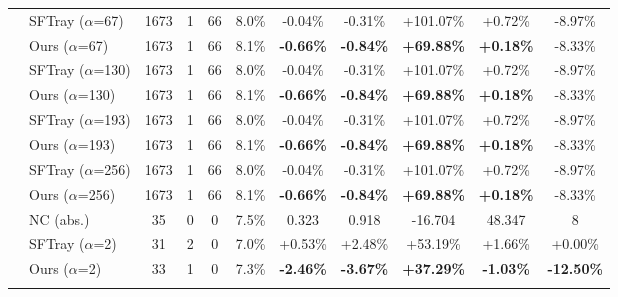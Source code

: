 \begin{table}[t]
{\begin{tabular}{ll|cccc|ccc|cc}
 & SFTray ($\alpha$=67) & 1673 & 1 & 66 & 8.0\% & -0.04\% & -0.31\% & +101.07\% & +0.72\% & -8.97\% \\

 & Ours ($\alpha$=67) & 1673 & 1 & 66 & 8.1\% & \textbf{-0.66\%} & \textbf{-0.84\%} & \textbf{+69.88\%} & \textbf{+0.18\%} & -8.33\% \\

\addlinespace[0.3em]

 & SFTray ($\alpha$=130) & 1673 & 1 & 66 & 8.0\% & -0.04\% & -0.31\% & +101.07\% & +0.72\% & -8.97\% \\

 & Ours ($\alpha$=130) & 1673 & 1 & 66 & 8.1\% & \textbf{-0.66\%} & \textbf{-0.84\%} & \textbf{+69.88\%} & \textbf{+0.18\%} & -8.33\% \\

\addlinespace[0.3em]

 & SFTray ($\alpha$=193) & 1673 & 1 & 66 & 8.0\% & -0.04\% & -0.31\% & +101.07\% & +0.72\% & -8.97\% \\

 & Ours ($\alpha$=193) & 1673 & 1 & 66 & 8.1\% & \textbf{-0.66\%} & \textbf{-0.84\%} & \textbf{+69.88\%} & \textbf{+0.18\%} & -8.33\% \\

\addlinespace[0.3em]

 & SFTray ($\alpha$=256) & 1673 & 1 & 66 & 8.0\% & -0.04\% & -0.31\% & +101.07\% & +0.72\% & -8.97\% \\

 & Ours ($\alpha$=256) & 1673 & 1 & 66 & 8.1\% & \textbf{-0.66\%} & \textbf{-0.84\%} & \textbf{+69.88\%} & \textbf{+0.18\%} & -8.33\% \\

\addlinespace[0.3em]

\midrule

\multirow{17}{*}{gcd} & NC (abs.) & 35 & 0 & 0 & 7.5\% & 0.323 & 0.918 & -16.704 & 48.347 & 8 \\

\addlinespace[0.4em]

 & SFTray ($\alpha$=2) & 31 & 2 & 0 & 7.0\% & +0.53\% & +2.48\% & +53.19\% & +1.66\% & +0.00\% \\

 & Ours ($\alpha$=2) & 33 & 1 & 0 & 7.3\% & \textbf{-2.46\%} & \textbf{-3.67\%} & \textbf{+37.29\%} & \textbf{-1.03\%} & \textbf{-12.50\%} \\

\addlinespace[0.3em]


\end{tabular}}
\end{table}
